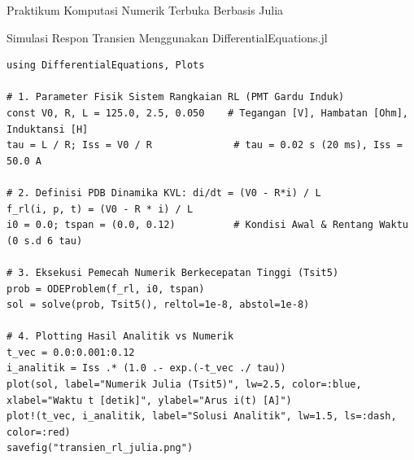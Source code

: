 \documentclass[aspectratio=169,10pt]{beamer}
\begin{document}
\begin{frame}[fragile]{Praktikum Komputasi Numerik Terbuka Berbasis Julia}
  \begin{block}{Simulasi Respon Transien Menggunakan DifferentialEquations.jl}
\begin{lstlisting}[style=juliastyle]
using DifferentialEquations, Plots

# 1. Parameter Fisik Sistem Rangkaian RL (PMT Gardu Induk)
const V0, R, L = 125.0, 2.5, 0.050    # Tegangan [V], Hambatan [Ohm], Induktansi [H]
tau = L / R; Iss = V0 / R              # tau = 0.02 s (20 ms), Iss = 50.0 A

# 2. Definisi PDB Dinamika KVL: di/dt = (V0 - R*i) / L
f_rl(i, p, t) = (V0 - R * i) / L
i0 = 0.0; tspan = (0.0, 0.12)          # Kondisi Awal & Rentang Waktu (0 s.d 6 tau)

# 3. Eksekusi Pemecah Numerik Berkecepatan Tinggi (Tsit5)
prob = ODEProblem(f_rl, i0, tspan)
sol = solve(prob, Tsit5(), reltol=1e-8, abstol=1e-8)

# 4. Plotting Hasil Analitik vs Numerik
t_vec = 0.0:0.001:0.12
i_analitik = Iss .* (1.0 .- exp.(-t_vec ./ tau))
plot(sol, label="Numerik Julia (Tsit5)", lw=2.5, color=:blue, xlabel="Waktu t [detik]", ylabel="Arus i(t) [A]")
plot!(t_vec, i_analitik, label="Solusi Analitik", lw=1.5, ls=:dash, color=:red)
savefig("transien_rl_julia.png")
\end{lstlisting}
  \end{block}
\end{frame}
\end{document}
